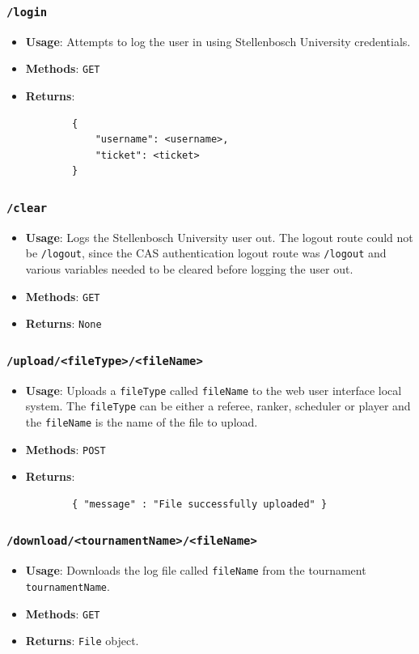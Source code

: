 \documentclass[a4paper, 11pt]{report}
\begin{document}
\subsubsection*{\texttt{/login}}
\begin{itemize}
	\item \textbf{Usage}: Attempts to log the user in using Stellenbosch
	University credentials.
	\item \textbf{Methods}: \texttt{GET}
	\item \textbf{Returns}:
	\begin{verbatim}
		{
		    "username": <username>,
		    "ticket": <ticket>
		}
	\end{verbatim}
\end{itemize}
\subsubsection*{\texttt{/clear}}
\begin{itemize}
	\item \textbf{Usage}: Logs the Stellenbosch University user out. The logout
	route could not be \texttt{/logout}, since the CAS authentication logout route
	was \texttt{/logout} and various variables needed to be cleared before logging
	the user out.
	\item \textbf{Methods}: \texttt{GET}
	\item \textbf{Returns}: \texttt{None}
\end{itemize}
\subsubsection*{\texttt{/upload/<fileType>/<fileName>}}
\begin{itemize}
	\item \textbf{Usage}: Uploads a \texttt{fileType} called \texttt{fileName}
	to the web user interface local system. The \texttt{fileType} can be either
	a referee, ranker, scheduler or player and the \texttt{fileName} is the name
	of the file to upload.
	\item \textbf{Methods}: \texttt{POST}
	\item \textbf{Returns}:
	\begin{verbatim}
		{ "message" : "File successfully uploaded" }
	\end{verbatim}
\end{itemize}
\subsubsection*{\texttt{/download/<tournamentName>/<fileName>}}
\begin{itemize}
	\item \textbf{Usage}: Downloads the log file called \texttt{fileName} from
	the tournament \texttt{tournamentName}.
	\item \textbf{Methods}: \texttt{GET}
	\item \textbf{Returns}: \texttt{File} object.
\end{itemize}
\end{document}
